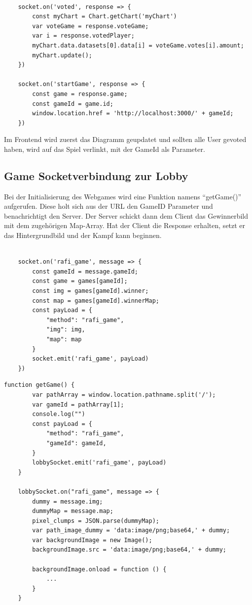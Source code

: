 \begin{lstlisting}[language=html,caption=User voted Client]

    socket.on('voted', response => {
        const myChart = Chart.getChart('myChart')
        var voteGame = response.voteGame;
        var i = response.votedPlayer;
        myChart.data.datasets[0].data[i] = voteGame.votes[i].amount;
        myChart.update();
    })

    socket.on('startGame', response => {
        const game = response.game;
        const gameId = game.id;
        window.location.href = 'http://localhost:3000/' + gameId;
    })
\end{lstlisting}
Im Frontend wird zuerst das Diagramm geupdatet und sollten alle User gevoted haben, wird auf das Spiel verlinkt, mit der GameId als Parameter.

\subsection{Game Socketverbindung zur Lobby}
Bei der Initialisierung des Webgames wird eine Funktion namens ``getGame()'' aufgerufen. Diese holt sich aus der URL den GameID Parameter und benachrichtigt den Server.
Der Server schickt dann dem Client das Gewinnerbild mit dem zugehörigen Map-Array.
Hat der Client die Response erhalten, setzt er das Hintergrundbild und der Kampf kann beginnen.
\begin{lstlisting}[language=html,caption=Webgame Socket Server]
    
    socket.on('rafi_game', message => {
        const gameId = message.gameId;
        const game = games[gameId];
        const img = games[gameId].winner;
        const map = games[gameId].winnerMap;
        const payLoad = {
            "method": "rafi_game",
            "img": img,
            "map": map
        }
        socket.emit('rafi_game', payLoad)
    })

\end{lstlisting}

\begin{lstlisting}[language=html,caption=Webgame Socket Client]
    function getGame() {
        var pathArray = window.location.pathname.split('/');
        var gameId = pathArray[1];
        console.log("")
        const payLoad = {
            "method": "rafi_game",
            "gameId": gameId,
        }
        lobbySocket.emit('rafi_game', payLoad)
    }

    lobbySocket.on("rafi_game", message => {
        dummy = message.img;
        dummyMap = message.map;
        pixel_clumps = JSON.parse(dummyMap);
        var path_image_dummy = 'data:image/png;base64,' + dummy;
        var backgroundImage = new Image();
        backgroundImage.src = 'data:image/png;base64,' + dummy;
    
        backgroundImage.onload = function () {
            ...
        }
    }
\end{lstlisting}

